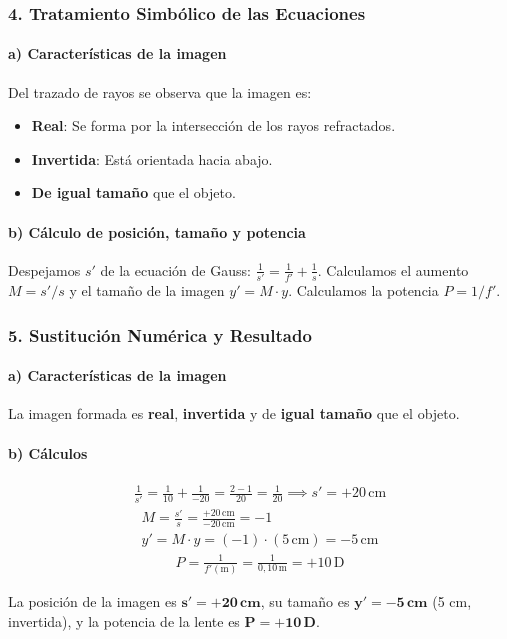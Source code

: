 \subsubsection*{4. Tratamiento Simbólico de las Ecuaciones}
\paragraph{a) Características de la imagen}
Del trazado de rayos se observa que la imagen es:
\begin{itemize}
    \item \textbf{Real}: Se forma por la intersección de los rayos refractados.
    \item \textbf{Invertida}: Está orientada hacia abajo.
    \item \textbf{De igual tamaño} que el objeto.
\end{itemize}

\paragraph{b) Cálculo de posición, tamaño y potencia}
Despejamos $s'$ de la ecuación de Gauss: $\frac{1}{s'} = \frac{1}{f'} + \frac{1}{s}$.
Calculamos el aumento $M = s'/s$ y el tamaño de la imagen $y' = M \cdot y$.
Calculamos la potencia $P=1/f'$.

\subsubsection*{5. Sustitución Numérica y Resultado}
\paragraph{a) Características de la imagen}
\begin{cajaresultado}
La imagen formada es \textbf{real}, \textbf{invertida} y de \textbf{igual tamaño} que el objeto.
\end{cajaresultado}

\paragraph{b) Cálculos}
\begin{gather}
    \frac{1}{s'} = \frac{1}{10} + \frac{1}{-20} = \frac{2-1}{20} = \frac{1}{20} \implies s' = +20\,\text{cm}
\end{gather}
\begin{gather}
    M = \frac{s'}{s} = \frac{+20\,\text{cm}}{-20\,\text{cm}} = -1 \\
    y' = M \cdot y = (-1) \cdot (5\,\text{cm}) = -5\,\text{cm}
\end{gather}
\begin{gather}
    P = \frac{1}{f'(\text{m})} = \frac{1}{0,10\,\text{m}} = +10\,\text{D}
\end{gather}
\begin{cajaresultado}
La posición de la imagen es $\boldsymbol{s' = +20\,\textbf{cm}}$, su tamaño es $\boldsymbol{y' = -5\,\textbf{cm}}$ (5 cm, invertida), y la potencia de la lente es $\boldsymbol{P = +10\,\textbf{D}}$.
\end{cajaresultado}

